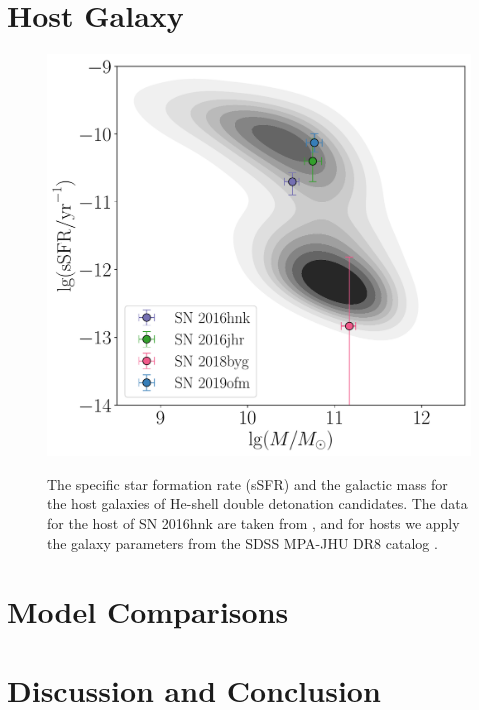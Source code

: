 \documentclass[twocolumn]{aastex631}
\begin{document}
\section{Host Galaxy} \label{sec:host}
\begin{figure}
    \centering
    \includegraphics[width=\linewidth]{host.pdf}
    \label{fig:host}
    \caption{The specific star formation rate (sSFR) and the galactic mass for the host galaxies of He-shell double detonation candidates. The data for the host of SN 2016hnk are taken from \citet{galbany_16hnk_2019}, and for hosts we apply the galaxy parameters from the SDSS MPA-JHU DR8 catalog \citep{Kauffmann_SDSS_2003,Brinchmann_SDSS_2004}.}
\end{figure}

\section{Model Comparisons} \label{sec:model}

\section{Discussion and Conclusion} \label{sec:discussion}

{}



\end{document}
